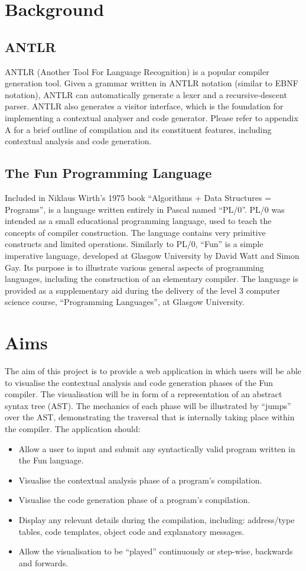 \documentclass{l4proj}
\begin{document}
\section{Background}
\subsection{ANTLR}
ANTLR (Another Tool For Language Recognition) is a popular compiler generation tool. Given a grammar written in ANTLR notation (similar to EBNF notation), ANTLR can automatically generate a lexer and a recursive-descent parser. ANTLR also generates a visitor interface, which is the foundation for implementing a contextual analyser and code generator. Please refer to appendix A for a brief outline of compilation and its constituent features, including contextual analysis and code generation.

\subsection{The Fun Programming Language}
Included in Niklaus Wirth's 1975 book ``Algorithms + Data Structures = Programs'', is a language written entirely in Pascal named ``PL/0''. PL/0 was intended as a small educational programming language, used to teach the concepts of compiler construction. The language contains very primitive constructs and limited operations. Similarly to PL/0, ``Fun'' is a simple imperative language, developed at Glasgow University by David Watt and Simon Gay. Its purpose is to illustrate various general aspects of programming languages, including the construction of an elementary compiler. The language is provided as a supplementary aid during the delivery of the level 3 computer science course, ``Programming Languages'', at Glasgow University.

\section{Aims}
The aim of this project is to provide a web application in which users will be able to visualise the contextual analysis and code generation phases of the Fun compiler. The visualisation will be in form of a representation of an abstract syntax tree (AST). The mechanics of each phase will be illustrated by ``jumps'' over the AST, demonstrating the traversal that is internally taking place within the compiler. The application should:
\begin{itemize}
\item Allow a user to input and submit any syntactically valid program written in the Fun language.
\item Visualise the contextual analysis phase of a program's compilation. 
\item Visualise the code generation phase of a program's compilation.
\item Display any relevant details during the compilation, including: address/type tables, code templates, object code and explanatory messages.
\item Allow the visualisation to be ``played'' continuously or step-wise, backwards and forwards.
\end{itemize}
\end{document}
